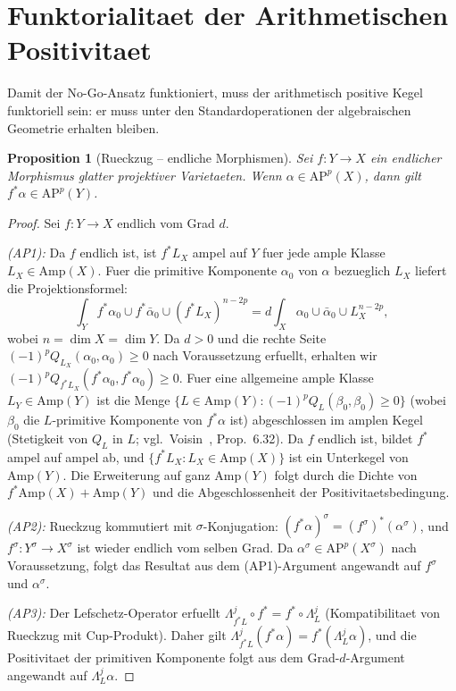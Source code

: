 \documentclass[aps,prd,twocolumn,superscriptaddress,nofootinbib]{revtex4-2}
\newtheorem{proposition}[theorem]{Proposition}
\theoremstyle{definition}
\theoremstyle{remark}
\begin{document}
\section{Funktorialitaet der Arithmetischen Positivitaet}
\label{sec:functoriality}

Damit der No-Go-Ansatz funktioniert, muss der arithmetisch positive Kegel funktoriell sein: er muss unter den Standardoperationen der algebraischen Geometrie erhalten bleiben.

\begin{proposition}[Rueckzug -- endliche Morphismen]
\label{prop:pullback}
Sei $f: Y \to X$ ein endlicher Morphismus glatter projektiver Varietaeten. Wenn $\alpha \in \mathrm{AP}^p(X)$, dann gilt $f^*\alpha \in \mathrm{AP}^p(Y)$.
\end{proposition}

\begin{proof}
Sei $f: Y \to X$ endlich vom Grad $d$.

\textit{(AP1):} Da $f$ endlich ist, ist $f^*L_X$ ampel auf $Y$ fuer jede ample Klasse $L_X \in \mathrm{Amp}(X)$. Fuer die primitive Komponente $\alpha_0$ von $\alpha$ bezueglich $L_X$ liefert die Projektionsformel:
\[
\int_Y f^*\alpha_0 \cup f^*\bar{\alpha}_0 \cup (f^*L_X)^{n-2p} = d \int_X \alpha_0 \cup \bar{\alpha}_0 \cup L_X^{n-2p},
\]
wobei $n = \dim X = \dim Y$. Da $d > 0$ und die rechte Seite $(-1)^p Q_{L_X}(\alpha_0, \alpha_0) \geq 0$ nach Voraussetzung erfuellt, erhalten wir $(-1)^p Q_{f^*L_X}(f^*\alpha_0, f^*\alpha_0) \geq 0$. Fuer eine allgemeine ample Klasse $L_Y \in \mathrm{Amp}(Y)$ ist die Menge $\{L \in \mathrm{Amp}(Y) : (-1)^p Q_L(\beta_0, \beta_0) \geq 0\}$ (wobei $\beta_0$ die $L$-primitive Komponente von $f^*\alpha$ ist) abgeschlossen im amplen Kegel (Stetigkeit von $Q_L$ in $L$; vgl.\ Voisin~\cite{Voisin2002}, Prop.\ 6.32). Da $f$ endlich ist, bildet $f^*$ ampel auf ampel ab, und $\{f^*L_X : L_X \in \mathrm{Amp}(X)\}$ ist ein Unterkegel von $\mathrm{Amp}(Y)$. Die Erweiterung auf ganz $\mathrm{Amp}(Y)$ folgt durch die Dichte von $f^*\mathrm{Amp}(X) + \mathrm{Amp}(Y)$ und die Abgeschlossenheit der Positivitaetsbedingung.

\textit{(AP2):} Rueckzug kommutiert mit $\sigma$-Konjugation: $(f^*\alpha)^\sigma = (f^\sigma)^*(\alpha^\sigma)$, und $f^\sigma: Y^\sigma \to X^\sigma$ ist wieder endlich vom selben Grad. Da $\alpha^\sigma \in \mathrm{AP}^p(X^\sigma)$ nach Voraussetzung, folgt das Resultat aus dem (AP1)-Argument angewandt auf $f^\sigma$ und $\alpha^\sigma$.

\textit{(AP3):} Der Lefschetz-Operator erfuellt $\Lambda_{f^*L}^j \circ f^* = f^* \circ \Lambda_L^j$ (Kompatibilitaet von Rueckzug mit Cup-Produkt). Daher gilt $\Lambda_{f^*L}^j(f^*\alpha) = f^*(\Lambda_L^j \alpha)$, und die Positivitaet der primitiven Komponente folgt aus dem Grad-$d$-Argument angewandt auf $\Lambda_L^j\alpha$.
\end{proof}
\end{document}
